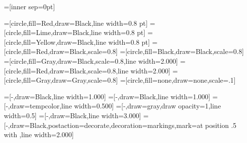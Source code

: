 

\usepackage[svgnames]{xcolor}
\usepackage{tikz}
\usetikzlibrary{decorations.markings}
\usetikzlibrary{shapes.geometric}

\newcommand\scaledLW{0.5} %

\newcommand\scaledNodeSize{0.5} %


=[inner sep=0pt]

=[circle,fill=Red,draw=Black,line width=0.8 pt]
=[circle,fill=Lime,draw=Black,line width=0.8 pt]
=[circle,fill=Yellow,draw=Black,line width=0.8 pt]
=[circle,fill=Red,draw=Black,scale=0.8]
=[circle,fill=Black,draw=Black,scale=0.8]
=[circle,fill=Gray,draw=Black,scale=0.8,line width=2.000]
=[circle,fill=Red,draw=Black,scale=0.8,line width=2.000]
=[circle,fill=Gray,draw=Gray,scale=0.8]
=[circle,fill=none,draw=none,scale=.1]




=[-,draw=Black,line width=1.000]
=[-,draw=Black,line width=1.000]
=[-,draw=tempcolor,line width=0.500]
=[-,draw=gray,draw opacity=1,line width=0.5]
=[-,draw=Black,line width=3.000]
=[-,draw=Black,postaction={decorate},decoration={markings,mark=at position .5 with {\arrow{>}}},line width=2.000]


